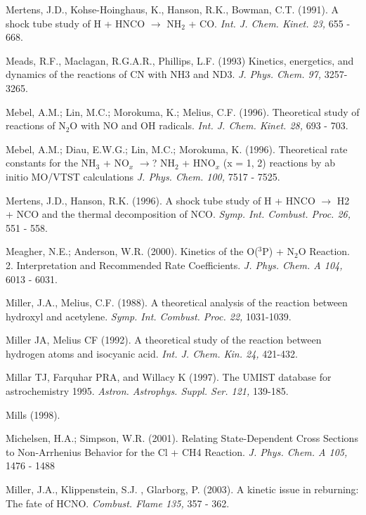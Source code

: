 \documentclass[12pt,landscape]{article}
\newcounter{reaction}
\begin{document}
Mertens, J.D., Kohse-Hoinghaus, K., Hanson, R.K., Bowman, C.T. (1991).  A shock tube study of H + HNCO $\rightarrow$ NH$_2$ + CO.  {\em Int. J. Chem. Kinet. 23,} 655 - 668.

Meads, R.F., Maclagan, R.G.A.R., Phillips, L.F. (1993) Kinetics, energetics, and dynamics of the reactions of CN with NH3 and ND3.   {\em J. Phys. Chem.  97,} 3257-3265.

Mebel, A.M.; Lin, M.C.; Morokuma, K.; Melius, C.F. (1996).  Theoretical study of reactions of N$_2$O with NO and OH radicals.  {\em Int. J. Chem. Kinet.  28,}  693 - 703.

Mebel, A.M.; Diau, E.W.G.; Lin, M.C.; Morokuma, K. (1996). Theoretical rate constants for the NH$_3$ + NO$_x$ $\rightarrow$? NH$_2$ + HNO$_x$ (x = 1, 2) reactions by ab initio MO/VTST calculations {\em J. Phys. Chem. 100,} 7517 - 7525.

 Mertens, J.D., Hanson, R.K. (1996). A shock tube study of H + HNCO $\rightarrow$ H2 + NCO and the thermal decomposition of NCO.  {\em Symp. Int. Combust. Proc. 26,} 551 - 558.

Meagher, N.E.; Anderson, W.R. (2000).  Kinetics of the O($^3$P) + N$_2$O Reaction. 2. Interpretation and Recommended Rate Coefficients. {\em J. Phys. Chem. A  104,} 6013 - 6031.

Miller, J.A., Melius, C.F. (1988). A theoretical analysis of the reaction between hydroxyl and acetylene. {\em Symp. Int. Combust. Proc. 22,} 1031-1039.

Miller JA, Melius CF (1992). A theoretical study of the reaction between hydrogen atoms and isocyanic acid.  {\em Int. J. Chem. Kin. 24,} 421-432.

Millar TJ, Farquhar PRA, and Willacy K (1997). The UMIST database for astrochemistry 1995. {\em Astron. Astrophys. Suppl. Ser. 121,} 139-185.

Mills (1998). 

Michelsen, H.A.; Simpson, W.R. (2001). Relating State-Dependent Cross Sections to Non-Arrhenius Behavior for the Cl + CH4 Reaction. {\em J. Phys. Chem. A 105,} 1476 - 1488

Miller, J.A., Klippenstein, S.J. , Glarborg, P. (2003).   A kinetic issue in reburning: The fate of HCNO.  {\em Combust. Flame 135,} 357 - 362.
\end{document}
